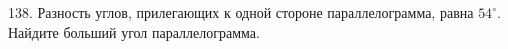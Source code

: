 138. Разность углов, прилегающих к одной стороне параллелограмма, равна $54^\circ.$ Найдите больший угол параллелограмма.\\
